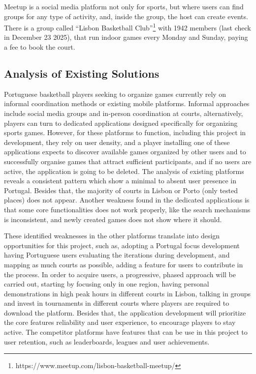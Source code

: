 Meetup is a social media platform not only for sports, but where users can find groups for any type of activity, and, inside the group, the host can create events. There is a group called ``Lisbon Basketball Club''\footnote{https://www.meetup.com/lisbon-basketball-meetup/} with 1942 members (last check in December 23 2025), that run indoor games every Monday and Sunday, paying a fee to book the court.


\subsection{Analysis of Existing Solutions}

Portuguese basketball players seeking to organize games currently rely on informal coordination methods or existing mobile platforms. Informal approaches include social media groups and in-person coordination at courts, alternatively, players can turn to dedicated applications designed specifically for organizing sports games. However, for these platforms to function, including this project in development, they rely on user density, and a player installing one of these applications expects to discover available games organized by other users and to successfully organise games that attract sufficient participants, and if no users are active, the application is going to be deleted. The analysis of existing platforms reveals a consistent pattern which show a minimal to absent user presence in Portugal. Besides that, the majority of courts in Lisbon or Porto (only tested places) does not appear. Another weakness found in the dedicated applications is that some core functionalities does not work properly, like the search mechanisms is inconsistent, and newly created games does not show where it should. 

These identified weaknesses in the other platforms translate into design opportunities for this project, such as, adopting a Portugal focus development having Portuguese users evaluating the iterations during development, and mapping as much courts as possible, adding a feature for users to contribute in the process. In order to acquire users, a progressive, phased approach will be carried out, starting by focusing only in one region, having personal demonstrations in high peak hours in different courts in Lisbon, talking in groups and invest in tournaments in different courts where players are required to download the platform. Besides that, the application development will prioritize the core features reliability and user experience, to encourage players to stay active.
The competitor platforms have features that can be use in this project to user retention, such as leaderboards, leagues and user achievements. 

